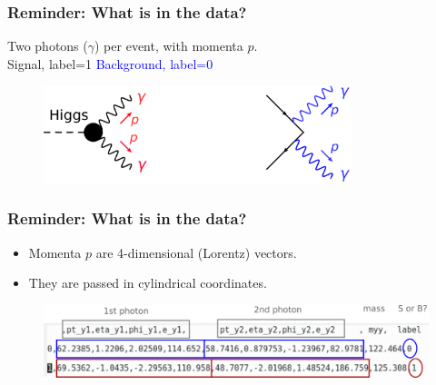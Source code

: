 \documentclass[11pt,xcolor=dvipsnames,aspectratio=169]{beamer}
\begin{document}
\begin{frame}
  \frametitle{\bf Reminder: What is in the data?}
  \begin{center}
    Two photons ($\gamma$) per event, with momenta $p$.\\
    \vspace{20pt}
  \textcolor{EDBRed}{\Large Signal, label=1} \hspace{0.25\textwidth}
  \textcolor{Blue}{\Large Background, label=0}
  \end{center}
      \begin{figure}
        \includegraphics[width=0.80\textwidth]{figures/l1/challenge/SvsB.png}
      \end{figure}     
\end{frame}

\begin{frame}
  \frametitle{\bf Reminder: What is in the data?}
  \begin{itemize}
  \item Momenta $p$ are  4-dimensional (Lorentz) vectors.
  \item They are passed in cylindrical coordinates.
  \end{itemize}
  \begin{figure}
    \includegraphics[width=1.00\textwidth]{figures/l1/challenge/data_annot.png}
  \end{figure}
\end{frame}
\end{document}
